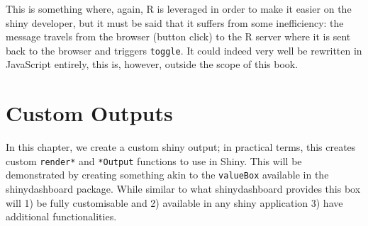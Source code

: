 \documentclass[
]{krantz}
\makeatletter
\newenvironment{Shaded}{\begin{snugshade}}{\end{snugshade}}
\newcommand{\ControlFlowTok}[1]{\textcolor[rgb]{0.27,0.27,0.27}{\textbf{#1}}}
\newcommand{\DataTypeTok}[1]{\textcolor[rgb]{0.27,0.27,0.27}{#1}}
\newcommand{\KeywordTok}[1]{\textcolor[rgb]{0.27,0.27,0.27}{\textbf{#1}}}
\newcommand{\NormalTok}[1]{#1}
\newcommand{\OperatorTok}[1]{\textcolor[rgb]{0.43,0.43,0.43}{\textbf{#1}}}
\newcommand{\StringTok}[1]{\textcolor[rgb]{0.5,0.5,0.5}{#1}}
\newenvironment{kframe}{%
\medskip{}
\setlength{\fboxsep}{.8em}
 \def\at@end@of@kframe{}%
 \ifinner\ifhmode%
  \def\at@end@of@kframe{\end{minipage}}%
  \begin{minipage}{\columnwidth}%
 \fi\fi%
 \def\FrameCommand##1{\hskip\@totalleftmargin \hskip-\fboxsep
 \colorbox{shadecolor}{##1}\hskip-\fboxsep
     \hskip-\linewidth \hskip-\@totalleftmargin \hskip\columnwidth}%
 \MakeFramed {\advance\hsize-\width
   \@totalleftmargin\z@ \linewidth\hsize
   \@setminipage}}%
 {\par\unskip\endMakeFramed%
 \at@end@of@kframe}
\renewenvironment{Shaded}{\begin{kframe}}{\end{kframe}}
\makeatother
\begin{document}
\begin{Shaded}
\end{Shaded}

This is something where, again, R is leveraged in order to make it easier on the shiny developer, but it must be said that it suffers from some inefficiency: the message travels from the browser (button click) to the R server where it is sent back to the browser and triggers \texttt{toggle}. It could indeed very well be rewritten in JavaScript entirely, this is, however, outside the scope of this book.

\hypertarget{shiny-output}{%
\chapter{Custom Outputs}\label{shiny-output}}

In this chapter, we create a custom shiny output; in practical terms, this creates custom \texttt{render*} and \texttt{*Output} functions to use in Shiny. This will be demonstrated by creating something akin to the \texttt{valueBox} available in the shinydashboard \citep{R-shinydashboard} package. While similar to what shinydashboard provides this box will 1) be fully customisable and 2) available in any shiny application 3) have additional functionalities.
\end{document}
